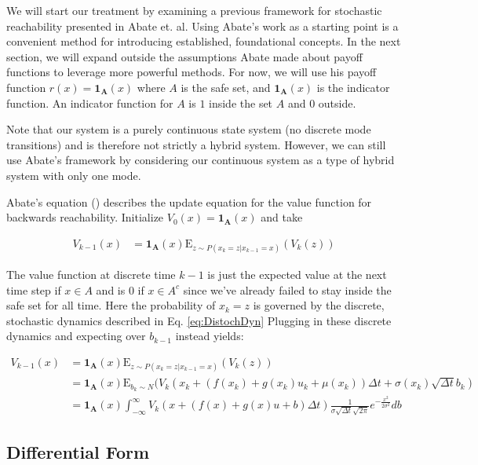 \documentclass[a4paper]{article}
\begin{document}
We will start our treatment by examining a previous framework for stochastic reachability presented in Abate et. al. %
Using Abate's work as a starting point is a convenient method for introducing established, foundational concepts.
In the next section, we will expand outside the assumptions Abate made about payoff functions to leverage more powerful methods.
For now, we will use his payoff function $r(x) = \mathbf{1_A}(x)$ where $A$ is the safe set, and $\mathbf{1_A}(x)$ is the indicator function.
An indicator function for $A$ is $1$ inside the set $A$ and $0$ outside.

Note that our system is a purely continuous state system (no discrete mode transitions) and is therefore not strictly a hybrid system.
However, we can still use Abate's framework by considering our continuous system as a type of hybrid system with only one mode.

Abate's equation () describes the update equation for the value function for backwards reachability.
Initialize $V_0(x) = \mathbf{1_A}(x)$ and take

\begin{align*}
V_{k-1}(x) & = \mathbf{1_A}(x) \mathrm{E}_{z \sim P(x_k = z | x_{k-1}=x)} (V_k(z))
\end{align*}

The value function at discrete time $k-1$ is just the expected value at the next time step if $x \in A$ and is 0 if $x \in A^c$ since we've already failed to stay inside the safe set for all time.
Here the probability of $x_k = z$ is governed by the discrete, stochastic dynamics described in Eq. \ref{eq:DistochDyn}
Plugging in these discrete dynamics and expecting over $b_{k-1}$ instead yields:

\begin{align*}
V_{k-1}(x) & = \mathbf{1_A}(x) \mathrm{E}_{z \sim P(x_k = z | x_{k-1}=x)} (V_k(z))
\\ & = \mathbf{1_A}(x) \mathrm{E}_{b_k\sim N} (V_k( x_k + (f(x_k) + g(x_k) u_k + \mu(x_k)) \Delta t + \sigma(x_k) \sqrt{\Delta t} b_k )
\\ & = \mathbf{1_A}(x) \int_{-\infty}^{\infty} V_k( x + (f(x) + g(x) u + b) \Delta t)      \frac{1}{\sigma \sqrt{\Delta t} \sqrt{2 \pi}} e^{-\frac{x^2}{2 \sigma^2}} db
\end{align*}

\subsection{Differential Form}
\end{document}
